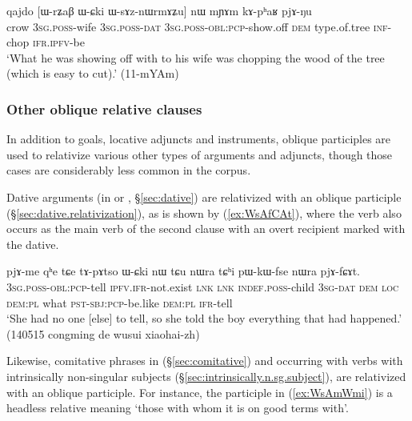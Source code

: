 \begin{exe}
\ex \label{ex:WsAznWrmAZu}
\gll qajdo [ɯ-rʑaβ ɯ-ɕki ɯ-sɤz-nɯrmɤʑu] nɯ mɲɤm kɤ-pʰaʁ pjɤ-ŋu  \\
crow \textsc{3sg}.\textsc{poss}-wife \textsc{3sg}.\textsc{poss}-\textsc{dat} \textsc{3sg}.\textsc{poss}-\textsc{obl}:\textsc{pcp}-show.off \textsc{dem} type.of.tree \textsc{inf}-chop \textsc{ifr}.\textsc{ipfv}-be \\
\glt  `What he was showing off with to his wife was chopping the wood of the  tree (which is easy to cut).' (11-mYAm)
\end{exe}

\subsubsection{Other oblique relative clauses} \label{sec:other.oblique.participle.relatives}
In addition to goals, locative adjuncts and instruments, oblique participles are used to relativize various other types of arguments and adjuncts, though those cases are considerably less common in the corpus.

Dative arguments (in  or , §\ref{sec:dative}) are relativized with an oblique participle (§\ref{sec:dative.relativization}), as is shown by (\ref{ex:WsAfCAt}),  where the verb  also occurs as the main verb of the second clause with an overt recipient marked with the dative.

\begin{exe}
\ex \label{ex:WsAfCAt}
\gll [ɯ-sɤ-fɕɤt] pjɤ-me qʰe tɕe tɤ-pɤtso ɯ-ɕki nɯ tɕu nɯra tɕʰi pɯ-kɯ-fse nɯra pjɤ-fɕɤt. \\
\textsc{3sg}.\textsc{poss}-\textsc{obl}:\textsc{pcp}-tell \textsc{ipfv}.\textsc{ifr}-not.exist \textsc{lnk} \textsc{lnk} \textsc{indef}.\textsc{poss}-child \textsc{3sg}-\textsc{dat} \textsc{dem} \textsc{loc} \textsc{dem}:\textsc{pl} what \textsc{pst}-\textsc{sbj}:\textsc{pcp}-be.like  \textsc{dem}:\textsc{pl} \textsc{ifr}-tell \\
\glt `She had no one [else] to tell, so she told the boy everything that had happened.' (140515 congming de wusui xiaohai-zh) 	
\end{exe} 

Likewise, comitative phrases in  (§\ref{sec:comitative}) and occurring with verbs with intrinsically non-singular subjects (§\ref{sec:intrinsically.n.sg.subject}), are relativized with an oblique participle. For instance, the participle  in (\ref{ex:WsAmWmi}) is a headless relative meaning `those with whom it is on good terms with'.


